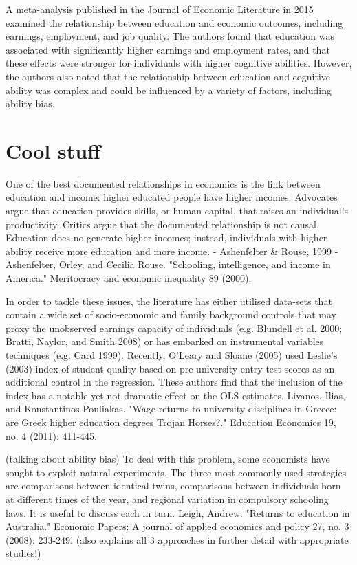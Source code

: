 A meta-analysis published in the Journal of Economic Literature in 2015 examined the relationship between education and economic outcomes, including earnings, employment, and job quality. The authors found that education was associated with significantly higher earnings and employment rates, and that these effects were stronger for individuals with higher cognitive abilities. However, the authors also noted that the relationship between education and cognitive ability was complex and could be influenced by a variety of factors, including ability bias.

\section*{Cool stuff}

One of the best documented relationships in economics is the link between education and income: higher educated people have higher incomes. Advocates argue that education provides skills, or human capital, that raises an individual's productivity. Critics argue that the documented relationship is not causal. Education does no generate higher incomes; instead, individuals with higher ability receive more education and more income. - Ashenfelter \& Rouse, 1999 - Ashenfelter, Orley, and Cecilia Rouse. "Schooling, intelligence, and income in America." Meritocracy and economic inequality 89 (2000).

In order to tackle these issues, the literature has either utilised data-sets that
contain a wide set of socio-economic and family background controls that may proxy
the unobserved earnings capacity of individuals (e.g. Blundell et al. 2000; Bratti,
Naylor, and Smith 2008) or has embarked on instrumental variables techniques (e.g.
Card 1999). Recently, O’Leary and Sloane (2005) used Leslie’s (2003) index of
student quality based on pre-university entry test scores as an additional control in the
regression. These authors find that the inclusion of the index has a notable yet not
dramatic effect on the OLS estimates.
Livanos, Ilias, and Konstantinos Pouliakas. "Wage returns to university disciplines in Greece: are Greek higher education degrees Trojan Horses?." Education Economics 19, no. 4 (2011): 411-445.


(talking about ability bias) To deal with this problem, some economists have sought to exploit natural experiments. The three most commonly used strategies are comparisons between identical twins, comparisons between individuals born at different times of the year, and regional variation in compulsory schooling laws. It is useful to discuss each in turn. Leigh, Andrew. "Returns to education in Australia." Economic Papers: A journal of applied economics and policy 27, no. 3 (2008): 233-249.
(also explains all 3 approaches in further detail with appropriate studies!)


